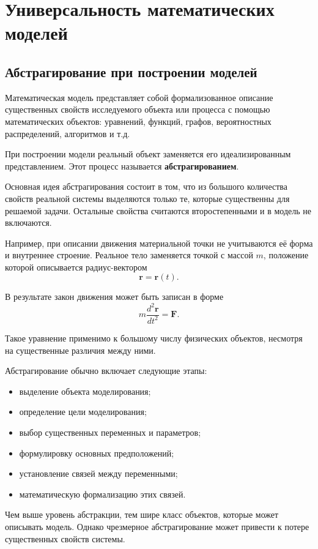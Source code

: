 \section{Универсальность математических моделей}

\subsection{Абстрагирование при построении моделей}

Математическая модель представляет собой формализованное описание существенных свойств исследуемого объекта или процесса с помощью математических объектов: уравнений, функций, графов, вероятностных распределений, алгоритмов и т.д.

При построении модели реальный объект заменяется его идеализированным представлением. Этот процесс называется \textbf{абстрагированием}.

Основная идея абстрагирования состоит в том, что из большого количества свойств реальной системы выделяются только те, которые существенны для решаемой задачи. Остальные свойства считаются второстепенными и в модель не включаются.

Например, при описании движения материальной точки не учитываются её форма и внутреннее строение. Реальное тело заменяется точкой с массой $m$, положение которой описывается радиус-вектором
\[
\mathbf r = \mathbf r(t).
\]

В результате закон движения может быть записан в форме
\[
m\frac{d^2\mathbf r}{dt^2} = \mathbf F.
\]

Такое уравнение применимо к большому числу физических объектов, несмотря на существенные различия между ними.

Абстрагирование обычно включает следующие этапы:
\begin{itemize}
	\item выделение объекта моделирования;
	\item определение цели моделирования;
	\item выбор существенных переменных и параметров;
	\item формулировку основных предположений;
	\item установление связей между переменными;
	\item математическую формализацию этих связей.
\end{itemize}

Чем выше уровень абстракции, тем шире класс объектов, которые может описывать модель. Однако чрезмерное абстрагирование может привести к потере существенных свойств системы.


